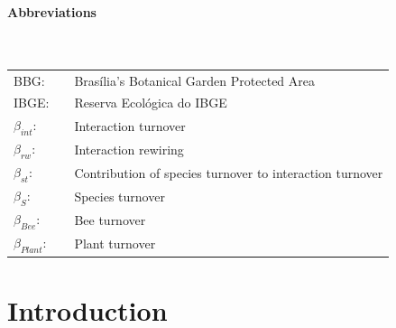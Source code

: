 \documentclass[11pt]{article}
\begin{document}
\newpage
{}
\vspace*{\fill}
\tableofcontents 
\vspace*{\fill} 
\thispagestyle{empty}

\doublespacing

\newpage 
\vspace*{\fill}
{\huge\bfseries Abbreviations} \\
\\
\\
\begin{table}[h]
\centering
\large
{}
\label{my-label}
\begin{tabular}{lll}
BBG:            && Bras\'ilia's Botanical Garden Protected Area             \\
IBGE:           &  & Reserva Ecol\'ogica do IBGE                              \\
$\beta_{int}$:   &  & Interaction turnover                                     \\
$\beta_{rw}$:    &  & Interaction rewiring                                     \\
$\beta_{st}$:    &  & Contribution of species turnover to interaction turnover \\
$\beta_{S}$:     &  & Species turnover                                         \\
$\beta_{Bee}$:   &  & Bee turnover                                             \\
$\beta_{Plant}$: &  & Plant turnover                                          
\end{tabular}
\end{table}
\vfill

\newpage
\pagestyle{fancy}
\fancyhf{}
\renewcommand{\headrulewidth}{0pt}

\section{Introduction} %
\end{document}
